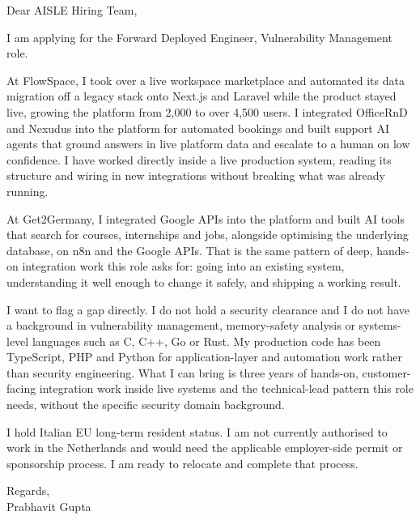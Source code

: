 \documentclass[a4paper,11pt]{article}
\begin{document}
Dear AISLE Hiring Team,

I am applying for the Forward Deployed Engineer, Vulnerability Management role.

At FlowSpace, I took over a live workspace marketplace and automated its data migration off a legacy stack onto Next.js and Laravel while the product stayed live, growing the platform from 2,000 to over 4,500 users. I integrated OfficeRnD and Nexudus into the platform for automated bookings and built support AI agents that ground answers in live platform data and escalate to a human on low confidence. I have worked directly inside a live production system, reading its structure and wiring in new integrations without breaking what was already running.

At Get2Germany, I integrated Google APIs into the platform and built AI tools that search for courses, internships and jobs, alongside optimising the underlying database, on n8n and the Google APIs. That is the same pattern of deep, hands-on integration work this role asks for: going into an existing system, understanding it well enough to change it safely, and shipping a working result.

I want to flag a gap directly. I do not hold a security clearance and I do not have a background in vulnerability management, memory-safety analysis or systems-level languages such as C, C++, Go or Rust. My production code has been TypeScript, PHP and Python for application-layer and automation work rather than security engineering. What I can bring is three years of hands-on, customer-facing integration work inside live systems and the technical-lead pattern this role needs, without the specific security domain background.

I hold Italian EU long-term resident status. I am not currently authorised to work in the Netherlands and would need the applicable employer-side permit or sponsorship process. I am ready to relocate and complete that process.

Regards,\\
Prabhavit Gupta
\end{document}
